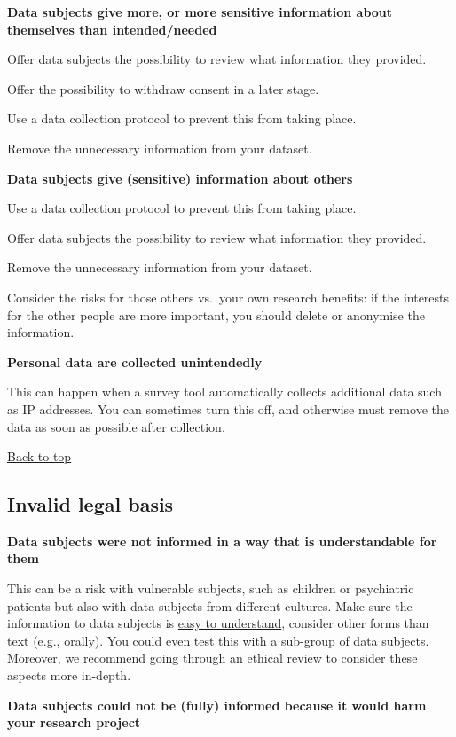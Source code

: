 \documentclass[
]{book}
\begin{document}
\textbf{Data subjects give more, or more sensitive information about themselves than intended/needed}

Offer data subjects the possibility to review what information they provided.

Offer the possibility to withdraw consent in a later stage.

Use a data collection protocol to prevent this from taking place.

Remove the unnecessary information from your dataset.

\textbf{Data subjects give (sensitive) information about others}

Use a data collection protocol to prevent this from taking place.

Offer data subjects the possibility to review what information they provided.

Remove the unnecessary information from your dataset.

Consider the risks for those others vs.~your own research benefits: if the interests for the other people are more important, you should delete or anonymise the information.

\textbf{Personal data are collected unintendedly}

This can happen when a survey tool automatically collects additional data such as IP addresses. You can sometimes turn this off, and otherwise must remove the data as soon as possible after collection.

\protect\hyperlink{example-risks}{Back to top}

\hypertarget{invalid-legal-basis}{%
\subsection{Invalid legal basis}\label{invalid-legal-basis}}

\textbf{Data subjects were not informed in a way that is understandable for them}

This can be a risk with vulnerable subjects, such as children or psychiatric patients but also with data subjects from different cultures. Make sure the information to data subjects is \protect\hyperlink{form-of-a-privacy-notice}{easy to understand}, consider other forms than text (e.g., orally). You could even test this with a sub-group of data subjects. Moreover, we recommend going through an ethical review to consider these aspects more in-depth.

\textbf{Data subjects could not be (fully) informed because it would harm your research project}
\end{document}
